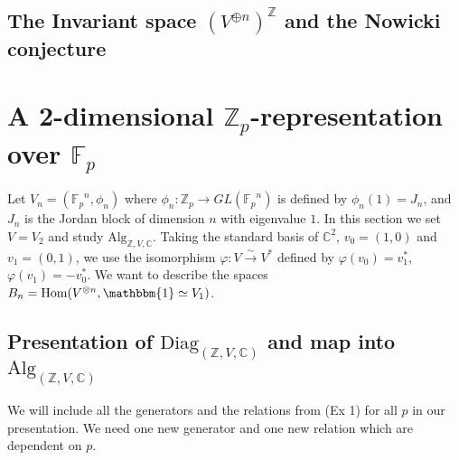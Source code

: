 \documentclass[11pt]{article} %
\begin{document}
\subsection{The Invariant space $(V^{\oplus n})^{\mathbb{Z}}$ and the Nowicki conjecture}
\section{A 2-dimensional $\mathbb{Z}_p$-representation over $\mathbb{F}_p$}

Let $V_n=({\mathbb{F}_p}^n,\phi_n)$ where $\phi_n: \mathbb{Z}_p \rightarrow GL({\mathbb{F}_p}^n)$ is defined by $\phi_n(1)=J_n$, and $J_n$ is the Jordan block of dimension $n$ with eigenvalue $1$. In this section we set $V=V_2$ and study $\text{Alg}_{\mathbb{Z},V, \mathbb{C}}$. Taking the standard basis of $\mathbb{C}^2$, $v_0 = (1,0)$ and  $v_1 = (0,1)$, we use the isomorphism $\varphi:V \xrightarrow{\sim} V^{\ast}$ defined by $\varphi(v_0)=v_1^{\ast}$, $\varphi(v_1)=-v_0^{\ast}$. We want to describe the spaces $B_n = \text{Hom}(V^{\otimes n},\mathbbm{1} \simeq V_1)$.

\subsection {Presentation of $\text{Diag}_{(\mathbb{Z},V,\mathbb{C})}$ and map into $\text{Alg}_{(\mathbb{Z},V,\mathbb{C})}$}

We will include all the generators and the relations from (Ex 1) for all $p$ in our presentation. We need one new generator and one new relation which are dependent on $p$.
\end{document}
